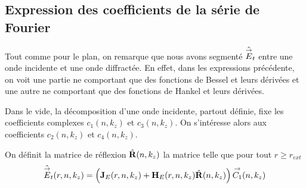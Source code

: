 
  \subsection{Expression des coefficients de la série de Fourier}

    Tout comme pour le plan, on remarque que nous avons segmenté \(\hat{{\overset{\rightarrow}{E}}}_t\) entre une onde incidente et une onde diffractée. En effet, dans les expressions précédente, on voit une partie ne comportant que des fonctions de Bessel et leurs dérivées et une autre ne comportant que des fonctions de Hankel et leurs dérivées.

    Dans le vide, la décomposition d'une onde incidente, partout définie, fixe les coefficients complexes \(c_1(n,k_z)\) et \(c_3(n,k_z)\). On s'intéresse alors aux coefficients \(c_2(n,k_z)\) et \(c_4(n,k_z)\).

    \begin{defn}
      On définit la matrice de réflexion \(\hat{\mathbf{R}}(n,k_z)\) la matrice telle que pour tout \(r\ge r_{ext}\)
      \begin{equation*}
        \hat{{\overset{\rightarrow}{E}}}_t(r,n,k_z) = \left(\mathbf{J}_E(r,n,k_z) + \mathbf{H}_E(r,n,k_z)\hat{\mathbf{R}}(n,k_z) \right){\overset{\rightarrow}{C_1}}(n,k_z)
      \end{equation*}
    \end{defn}

